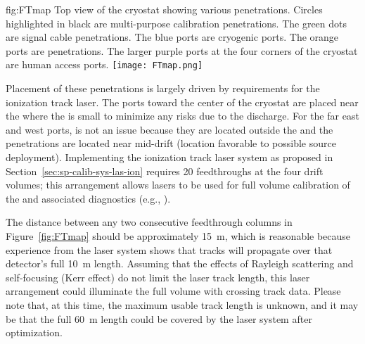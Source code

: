 
\begin{dunefigure}{fig:FTmap}
{Top view of the \spmod %
cryostat showing various penetrations. Circles highlighted in black are multi-purpose calibration penetrations. The green dots are  signal cable penetrations. The blue ports are cryogenic ports. The orange ports are  penetrations. The larger purple ports at the four corners of the cryostat are human access ports.}
\texttt{[image: FTmap.png]}
\end{dunefigure}





Placement of these penetrations is largely driven by requirements for the ionization track laser. %
The ports %
toward the center of the cryostat are placed near the  where the \efield is small  to minimize any risks due to the  discharge. For the far east and west ports,  is not an issue because they are located outside the  and the penetrations are located near mid-drift (location favorable to possible source deployment).
Implementing the ionization track laser system as proposed in Section~\ref{sec:sp-calib-sys-las-ion} requires \num{20} feedthroughs at the four  drift volumes; this arrangement allows lasers to be used for full volume calibration of the \efield and associated diagnostics (e.g., ). 

The distance between any two consecutive feedthrough columns in Figure~\ref{fig:FTmap} should be approximately \SI{15}{\m}, which is reasonable because experience from the  laser system shows that tracks will propagate over that detector's full \SI{10}{\m} length. Assuming that the effects of Rayleigh scattering and self-focusing (Kerr effect) do not limit the laser track length, this laser arrangement could illuminate the full volume with crossing track data.  Please note that, at this time, the maximum usable track length is unknown, and it may be that the full \SI{60}{\m} \detmodule length could be covered by the laser system after optimization.


